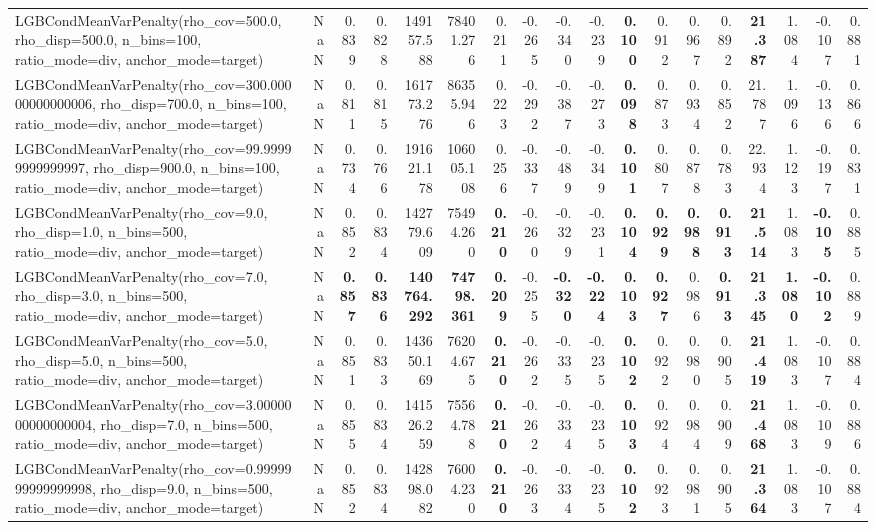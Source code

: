 \documentclass[11pt]{article}
\theoremstyle{plain}
\theoremstyle{definition}
\newcommand{\1}{\mathbf{1}}
\begin{document}
\begin{table}[htbp]
{\begin{tabular}{lrrrrrrrrrrrrrrrrr}
LGBCondMeanVarPenalty(rho\_cov=500.0, rho\_disp=500.0, n\_bins=100, ratio\_mode=div, anchor\_mode=target) & NaN & 0.839 & 0.828 & 149157.588 & 78401.276 & 0.211 & -0.265 & -0.340 & -0.239 & \textbf{0.100} & 0.912 & 0.967 & 0.892 & \textbf{21.387} & 1.084 & -0.107 & 0.881 \\
LGBCondMeanVarPenalty(rho\_cov=300.00000000000006, rho\_disp=700.0, n\_bins=100, ratio\_mode=div, anchor\_mode=target) & NaN & 0.811 & 0.815 & 161773.276 & 86355.946 & 0.223 & -0.292 & -0.387 & -0.273 & \textbf{0.098} & 0.873 & 0.934 & 0.852 & 21.787 & 1.096 & -0.136 & 0.866 \\
LGBCondMeanVarPenalty(rho\_cov=99.99999999999997, rho\_disp=900.0, n\_bins=100, ratio\_mode=div, anchor\_mode=target) & NaN & 0.734 & 0.766 & 191621.178 & 106005.108 & 0.256 & -0.337 & -0.489 & -0.349 & \textbf{0.101} & 0.807 & 0.878 & 0.783 & 22.934 & 1.123 & -0.197 & 0.831 \\
LGBCondMeanVarPenalty(rho\_cov=9.0, rho\_disp=1.0, n\_bins=500, ratio\_mode=div, anchor\_mode=target) & NaN & 0.852 & 0.834 & 142779.609 & 75494.260 & \textbf{0.210} & -0.260 & -0.329 & -0.231 & \textbf{0.104} & \textbf{0.929} & \textbf{0.988} & \textbf{0.913} & \textbf{21.514} & 1.083 & \textbf{-0.105} & 0.885 \\
LGBCondMeanVarPenalty(rho\_cov=7.0, rho\_disp=3.0, n\_bins=500, ratio\_mode=div, anchor\_mode=target) & NaN & \textbf{0.857} & \textbf{0.836} & \textbf{140764.292} & \textbf{74798.361} & \textbf{0.209} & -0.255 & \textbf{-0.320} & \textbf{-0.224} & \textbf{0.103} & \textbf{0.927} & 0.986 & \textbf{0.913} & \textbf{21.345} & \textbf{1.080} & \textbf{-0.102} & 0.889 \\
LGBCondMeanVarPenalty(rho\_cov=5.0, rho\_disp=5.0, n\_bins=500, ratio\_mode=div, anchor\_mode=target) & NaN & 0.851 & 0.833 & 143650.169 & 76204.675 & \textbf{0.210} & -0.262 & -0.335 & -0.235 & \textbf{0.102} & 0.922 & 0.980 & 0.905 & \textbf{21.419} & 1.083 & -0.107 & 0.884 \\
LGBCondMeanVarPenalty(rho\_cov=3.0000000000000004, rho\_disp=7.0, n\_bins=500, ratio\_mode=div, anchor\_mode=target) & NaN & 0.855 & 0.834 & 141526.259 & 75564.788 & \textbf{0.210} & -0.262 & -0.334 & -0.235 & \textbf{0.103} & 0.924 & 0.984 & 0.909 & \textbf{21.468} & 1.083 & -0.109 & 0.886 \\
LGBCondMeanVarPenalty(rho\_cov=0.9999999999999998, rho\_disp=9.0, n\_bins=500, ratio\_mode=div, anchor\_mode=target) & NaN & 0.852 & 0.834 & 142898.082 & 76004.230 & \textbf{0.210} & -0.263 & -0.334 & -0.235 & \textbf{0.102} & 0.923 & 0.981 & 0.905 & \textbf{21.364} & 1.083 & -0.107 & 0.884 \\

\end{tabular}}
\end{table}
\end{document}
